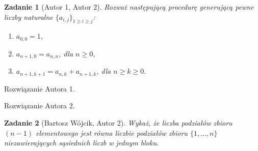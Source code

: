 \documentclass{mwart}
\newtheorem{zad}{Zadanie}[section]
\begin{document}
\begin{zad}[Autor 1, Autor 2]
    Rozważ  następującą procedurę generującą pewne liczby naturalne
    $\{a_{i,j}\}_{1 \geq i \geq j}$:
    \begin{enumerate}
        \item $a_{0,0} = 1$,
        \item $a_{n+1, 0} = a_{n,n}$, dla $n \geq 0$,
        \item $a_{n+1, k+1} = a_{n, k} + a_{n+1, k}$, dla $n \geq k \geq 0$.
    \end{enumerate}
\end{zad}
\begin{mdframed}
    Rozwiązanie Autora 1.
\end{mdframed}
\begin{mdframed}
    Rozwiązanie Autora 2.
\end{mdframed}




\begin{zad}[Bartosz Wójcik, Autor 2]
    Wykaż, że liczba podziałów zbioru $(n - 1)$  elementowego jest równa
    liczbie podziałów zbioru $\{1, ..., n\}$ niezawierających sąsiednich liczb w jednym bloku.
\end{zad}
\end{document}
